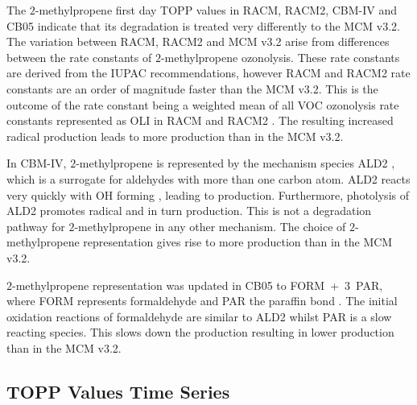 The $2$-methylpropene first day TOPP values in RACM, RACM2, CBM-IV and CB05 indicate that its degradation is treated very differently to the MCM v3.2. 
The variation between RACM, RACM2 and MCM v3.2 arise from differences between the rate constants of $2$-methylpropene ozonolysis. 
These rate constants are derived from the IUPAC recommendations\citep{IUPAC_Site}, however RACM and RACM2 rate constants are an order of magnitude faster than the MCM v3.2.
This is the outcome of the rate constant being a weighted mean of all VOC ozonolysis rate constants represented as OLI in RACM and RACM2 \citep{Stockwell:1997, Goliff:2013}.
The resulting increased radical production leads to more  production than in the MCM v3.2.

In CBM-IV, $2$-methylpropene is represented by the mechanism species ALD2 \citep{Hogo:1989}, which is a surrogate for aldehydes with more than one carbon atom. 
ALD2 reacts very quickly with OH forming , leading to  production. 
Furthermore, photolysis of ALD2 promotes radical and in turn  production. 
This is not a degradation pathway for $2$-methylpropene in any other mechanism. 
The choice of $2$-methylpropene representation gives rise to more  production than in the MCM v3.2.

$2$-methylpropene representation was updated in CB05 to \mbox{FORM + $3$ PAR}, where FORM represents formaldehyde and PAR the paraffin  bond \citep{Yarwood:2005}. 
The initial oxidation reactions of formaldehyde are similar to ALD2 whilst PAR is a slow reacting species. 
This slows down the  production resulting in lower  production than in the MCM v3.2.

\subsection{TOPP Values Time Series} \label{ss:profiles} %

